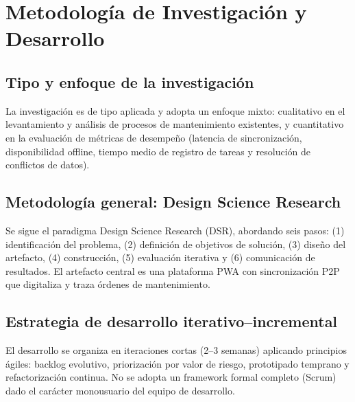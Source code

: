 \documentclass[12pt,a4paper]{report}
\begin{document}
\chapter*{Metodología de Investigación y Desarrollo}
\section*{Tipo y enfoque de la investigación} La investigación es de tipo aplicada y adopta un enfoque mixto: cualitativo en el levantamiento y análisis de procesos de mantenimiento existentes, y cuantitativo en la evaluación de métricas de desempeño (latencia de sincronización, disponibilidad offline, tiempo medio de registro de tareas y resolución de conflictos de datos).

\section*{Metodología general: Design Science Research} Se sigue el paradigma Design Science Research (DSR), abordando seis pasos: (1) identificación del problema, (2) definición de objetivos de solución, (3) diseño del artefacto, (4) construcción, (5) evaluación iterativa y (6) comunicación de resultados. El artefacto central es una plataforma PWA con sincronización P2P que digitaliza y traza órdenes de mantenimiento.

\section*{Estrategia de desarrollo iterativo–incremental} El desarrollo se organiza en iteraciones cortas (2–3 semanas) aplicando principios ágiles: backlog evolutivo, priorización por valor de riesgo, prototipado temprano y refactorización continua. No se adopta un framework formal completo (Scrum) dado el carácter monousuario del equipo de desarrollo.
\end{document}
